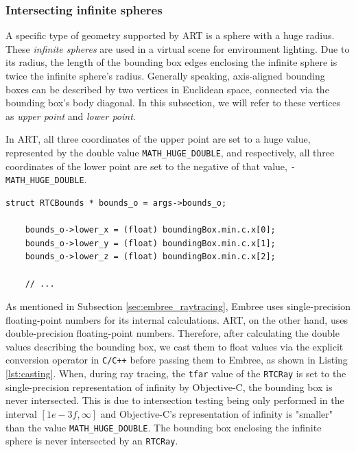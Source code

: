 \subsubsection{Intersecting infinite spheres}

A specific type of geometry supported by ART is a sphere with a huge radius. These \emph{infinite spheres} are used in a virtual scene for environment lighting.
Due to its radius, the length of the bounding box edges enclosing the infinite sphere is twice the infinite sphere's radius. 
Generally speaking, axis-aligned bounding boxes can be described by two vertices in Euclidean space, connected via the bounding box's body diagonal. In this subsection, we will refer to these vertices as \emph{upper point} and \emph{lower point}. 

In ART, all three coordinates of the upper point are set to a huge value, represented by the double value \texttt{MATH\_HUGE\_DOUBLE}, and respectively, all three coordinates of the lower point are set to the negative of that value, \texttt{- MATH\_HUGE\_DOUBLE}.

\begin{listing} 
	\begin{lstlisting}[caption={Casting of a double precision floating point number to a single precision floating point number by explicit conversion.}, label={lst:casting}]
	struct RTCBounds * bounds_o = args->bounds_o;
	
	bounds_o->lower_x = (float) boundingBox.min.c.x[0];
	bounds_o->lower_y = (float) boundingBox.min.c.x[1];
	bounds_o->lower_z = (float) boundingBox.min.c.x[2];
	
	// ...
	\end{lstlisting}
\end{listing}

As mentioned in Subsection \ref{sec:embree_raytracing}, Embree uses single-precision floating-point numbers for its internal calculations. ART, on the other hand, uses double-precision floating-point numbers. Therefore, after calculating the double values describing the bounding box, we cast them to float values via the explicit conversion operator in \texttt{C/C++} before passing them to Embree, as shown in Listing \ref{lst:casting}.  
When, during ray tracing, the \texttt{tfar} value of the \texttt{RTCRay} is set to the single-precision representation of infinity by Objective-C, the bounding box is never intersected. This is due to intersection testing being only performed in the interval $[1e-3f,\infty]$ and Objective-C's representation of infinity is "smaller" than the value \texttt{MATH\_HUGE\_DOUBLE}. The bounding box enclosing the infinite sphere is never intersected by an \texttt{RTCRay}.

